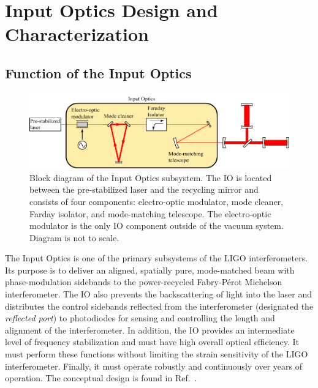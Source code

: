 \chapter{Input Optics Design and Characterization}

\section{Function of the Input Optics}
\label{sec:role}

\begin{figure}
\begin{centering}
\includegraphics{figures/InputOpticsBlock_thesis.pdf}
\caption[Block diagram of the Input Optics subsystem.]{Block diagram
  of the Input Optics subsystem. The IO is located between the
  pre-stabilized laser and the recycling mirror and consists of four
  components: electro-optic modulator, mode cleaner, Farday isolator,
  and mode-matching telescope. The electro-optic modulator is the only
  IO component outside of the vacuum system. Diagram is not to scale.}
\label{fig:IOblock}
\end{centering}
\end{figure}

The Input Optics is one of the primary subsystems of the LIGO
interferometers. Its purpose is to deliver an aligned, spatially
pure, mode-matched beam with phase-modulation sidebands to the
power-recycled Fabry-P\'{e}rot Michelson interferometer. The IO also
prevents the backscattering of light into the laser and distributes
the control sidebands reflected from the interferometer (designated
the \emph{reflected port}) to photodiodes for sensing and controlling
the length and alignment of the interferometer. In addition, the IO
provides an intermediate level of frequency stabilization and must
have high overall optical efficiency. It must perform these functions
without limiting the strain sensitivity of the LIGO interferometer.
Finally, it must operate robustly and continuously over years of
operation. The conceptual design is found in
Ref.~\citep{Camp1996InputOutput}.

